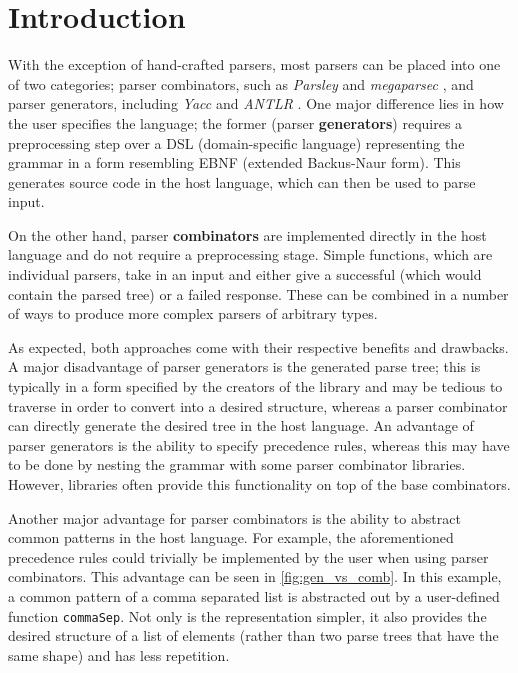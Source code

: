 \chapter{Introduction}
\label{chap:intro}

With the exception of hand-crafted parsers, most parsers can be placed into one of two categories; parser combinators, such as \textit{Parsley} \cite{willis18} and \textit{megaparsec} \cite{megaparsec}, and parser generators, including \textit{Yacc} \cite{johnson75} and \textit{ANTLR} \cite{parr14}.
One major difference lies in how the user specifies the language; the former (parser \textbf{generators}) requires a preprocessing step over a DSL (domain-specific language) representing the grammar in a form resembling EBNF (extended Backus-Naur form).
This generates source code in the host language, which can then be used to parse input.

On the other hand, parser \textbf{combinators} are implemented directly in the host language and do not require a preprocessing stage.
Simple functions, which are individual parsers, take in an input and either give a successful (which would contain the parsed tree) or a failed response.
These can be combined in a number of ways to produce more complex parsers of arbitrary types.

As expected, both approaches come with their respective benefits and drawbacks.
A major disadvantage of parser generators is the generated parse tree; this is typically in a form specified by the creators of the library and may be tedious to traverse in order to convert into a desired structure, whereas a parser combinator can directly generate the desired tree in the host language.
An advantage of parser generators is the ability to specify precedence rules, whereas this may have to be done by nesting the grammar with some parser combinator libraries.
However, libraries often provide this functionality on top of the base combinators.

Another major advantage for parser combinators is the ability to abstract common patterns in the host language.
For example, the aforementioned precedence rules could trivially be implemented by the user when using parser combinators.
This advantage can be seen in \autoref{fig:gen_vs_comb}.
In this example, a common pattern of a comma separated list is abstracted out by a user-defined function \texttt{commaSep}.
Not only is the representation simpler, it also provides the desired structure of a list of elements (rather than two parse trees that have the same shape) and has less repetition.

